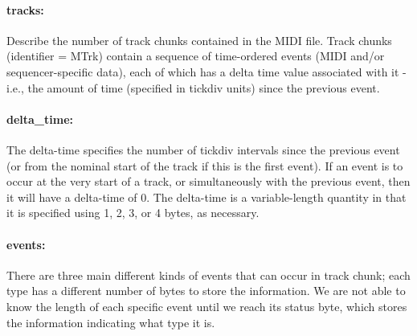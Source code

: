 \documentclass[runningheads]{llncs}
\begin{document}
\paragraph{\textbf{tracks:}} Describe the number of track chunks contained in the MIDI file. Track chunks \label{gloss:track_chunk} (identifier = MTrk) contain a sequence of time-ordered events (MIDI and/or sequencer-specific data), each of which has a delta time value associated with it - i.e., the amount of time (specified in tickdiv units) since the previous event.

\paragraph{\textbf{delta\_time:}} The delta-time specifies the number of tickdiv intervals since the previous event (or from the nominal start of the track if this is the first event). If an event is to occur at the very start of a track, or simultaneously with the previous event, then it will have a delta-time of 0. The delta-time is a variable-length quantity in that it is specified using 1, 2, 3, or 4 bytes, as necessary.

\paragraph{\textbf{events:}} There are three main different kinds of events that can occur in track chunk; each type has a different number of bytes to store the information. We are not able to know the length of each specific event until we reach its status byte, which stores the information indicating what type it is.
\end{document}
